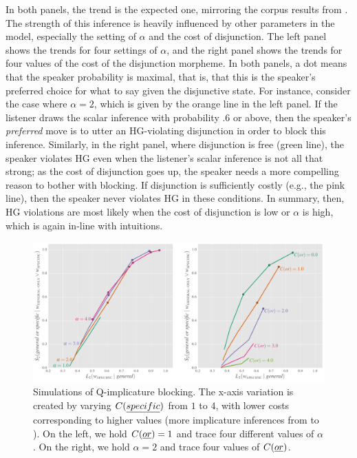 \documentclass[12pt,twoside]{article}
\renewcommand{\_}{\textbf{\textunderscore\hspace{-4pt}\textunderscore\hspace{-3pt}\textunderscore\hspace{-4pt}\textunderscore}\hspace{0.5pt}}			%
\begin{document}
In both panels, the trend is the expected one, mirroring the corpus
results from . The strength of this inference is
heavily influenced by other parameters in the model, especially the
setting of $\alpha$ and the cost of disjunction. The left panel shows
the trends for four settings of $\alpha$, and the right panel shows
the trends for four values of the cost of the disjunction morpheme. In
both panels, a dot means that the speaker probability is maximal, that
is, that this is the speaker's preferred choice for what to say given
the disjunctive state. For instance, consider the case where
$\alpha=2$, which is given by the orange line in the left panel. If
the listener draws the scalar inference with probability $.6$ or
above, then the speaker's \emph{preferred} move is to utter an
HG-violating disjunction in order to block this inference. Similarly,
in the right panel, where disjunction is free (green line), the
speaker violates HG even when the listener's scalar inference is not
all that strong; as the cost of disjunction goes up, the speaker needs
a more compelling reason to bother with blocking. If disjunction is
sufficiently costly (e.g., the pink line), then the speaker never
violates HG in these conditions. In summary, then, HG violations are
most likely when the cost of disjunction is low or $\alpha$ is high,
which is again in-line with intuitions.

\begin{figure}[tp]
  \centering
  \includegraphics[width=1\textwidth]{fig/Q-implicature-simulation}  
  \caption{Simulations of Q-implicature blocking. The x-axis variation is 
    created by varying $C(\emph{specific})$ from $1$ to $4$, with lower
    costs corresponding to higher values (more implicature inferences
    from  to ).  On the left, we hold
    $C(\emph{or}) =1$ and trace four different values of
    $\alpha$. On the right, we hold $\alpha=2$ and trace four values
    of $C(\emph{or})$.}
  \label{fig:qsims}
\end{figure}
\end{document}
